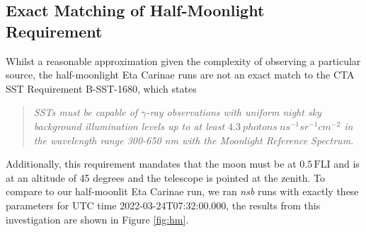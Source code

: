 \subsection{Exact Matching of Half-Moonlight Requirement}
Whilst a reasonable approximation given the complexity of observing a particular source, the half-moonlight Eta Carinae runs are not an exact match to the CTA SST Requirement B-SST-1680, which states
\begin{quote}
    \textit{SSTs must be capable of $\gamma$-ray observations with uniform night sky background illumination levels up to at least $4.3\ photons\ ns^{-1} sr^{-1} cm^{-2}$ in the wavelength range 300-650 nm with the Moonlight Reference Spectrum.}
\end{quote}
Additionally, this requirement mandates that the moon must be at $\mathrm{0.5\,FLI}$ and is at an altitude of 45 degrees and the telescope is pointed at the zenith. To compare to our half-moonlit Eta Carinae run, we ran \textit{nsb} runs with exactly these parameters for UTC time 2022-03-24T07:32:00.000, the results from this investigation are shown in Figure \ref{fig:hm}.

